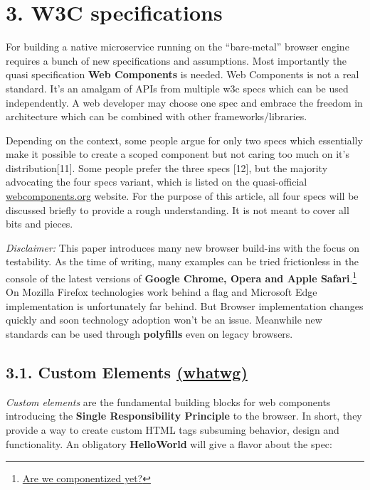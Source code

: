 \documentclass[]{article}
\begin{document}
\section{3. W3C specifications}\label{w3c-specifications}

For building a native microservice running on the ``bare-metal'' browser
engine requires a bunch of new specifications and assumptions. Most
importantly the quasi specification \textbf{Web Components} is needed.
Web Components is not a real standard. It's an amalgam of APIs from
multiple w3c specs which can be used independently. A web developer may
choose one spec and embrace the freedom in architecture which can be
combined with other frameworks/libraries.

Depending on the context, some people argue for only two specs which
essentially make it possible to create a scoped component but not caring
too much on it's distribution{[}11{]}. Some people prefer the three
specs {[}12{]}, but the majority advocating the four specs variant,
which is listed on the quasi-official
\href{http://webcomponents.org}{webcomponents.org} website. For the
purpose of this article, all four specs will be discussed briefly to
provide a rough understanding. It is not meant to cover all bits and
pieces.

\emph{Disclaimer:} This paper introduces many new browser build-ins with
the focus on testability. As the time of writing, many examples can be
tried frictionless in the console of the latest versions of
\textbf{Google Chrome, Opera and Apple Safari}.\footnote{\href{http://jonrimmer.github.io/are-we-componentized-yet/}{Are
  we componentized yet?}} On Mozilla Firefox technologies work behind a
flag and Microsoft Edge implementation is unfortunately far behind. But
Browser implementation changes quickly and soon technology adoption
won't be an issue. Meanwhile new standards can be used through
\textbf{polyfills} even on legacy browsers.

\subsection{\texorpdfstring{3.1. Custom Elements
\href{https://html.spec.whatwg.org/multipage/scripting.html\#custom-elements}{(whatwg)}}{3.1. Custom Elements (whatwg)}}\label{custom-elements-whatwg}

\emph{Custom elements} are the fundamental building blocks for web
components introducing the \textbf{Single Responsibility Principle} to
the browser. In short, they provide a way to create custom HTML tags
subsuming behavior, design and functionality. An obligatory
\textbf{HelloWorld} will give a flavor about the spec:
\end{document}
